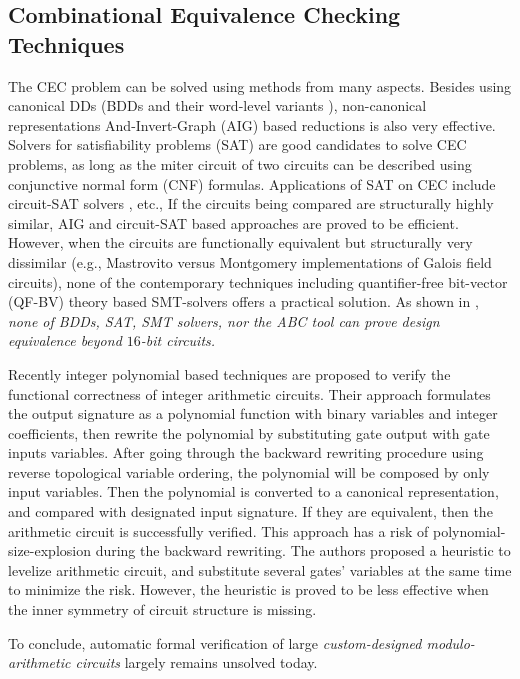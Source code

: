 \subsection{Combinational Equivalence Checking Techniques}
The CEC problem can be solved using methods from many aspects.
Besides using canonical DDs (BDDs
\cite{BRYA86} and their word-level variants \cite{WLS}),
non-canonical representations And-Invert-Graph (AIG) based reductions \cite{AIG:2002}
\cite{alanmi:cec:iccad2006} is also very effective. 
Solvers for satisfiability problems (SAT) are good candidates to solve CEC problems,
as long as the miter circuit of two circuits can be described using conjunctive normal form (CNF)
formulas. Applications of SAT on CEC include circuit-SAT solvers \cite{csat}, etc.,
If the circuits being compared are structurally highly similar, AIG and circuit-SAT 
based approaches are proved to be efficient.
However, when the circuits are functionally equivalent but structurally very dissimilar (e.g.,
Mastrovito \cite{mastro:1989} versus Montgomery implementations
\cite{acar:1998} of Galois field circuits), none of the 
  contemporary techniques including quantifier-free bit-vector 
  (QF-BV) theory based SMT-solvers \cite{Cryptol:fmcad09}
  offers a practical solution. As shown in \cite{lv:phd}, {\it none of BDDs, SAT, SMT
  solvers, nor the  ABC tool can prove design equivalence beyond
  $16$-bit circuits.}     


Recently integer polynomial based techniques \cite{ciesielski2014function,rolf:date16} are proposed  to verify the functional 
correctness of integer arithmetic circuits. Their approach formulates the output signature as a polynomial function 
with binary variables and integer coefficients, then rewrite the polynomial by substituting gate output with gate inputs
variables. After going through the backward rewriting procedure using reverse topological variable ordering, the polynomial
will be composed by only input variables. Then the polynomial is converted to a canonical representation, and compared
with designated input signature. If they are equivalent, then the arithmetic circuit is successfully verified.
This approach has a risk of polynomial-size-explosion during the backward rewriting. The authors proposed a heuristic
to levelize arithmetic circuit, and substitute several gates' variables at the same time to minimize the risk. However, 
the heuristic is proved to be less effective when the inner symmetry of circuit structure is missing.

To conclude, automatic formal verification of large {\it
    custom-designed modulo-arithmetic circuits} largely remains
  unsolved today.
  
